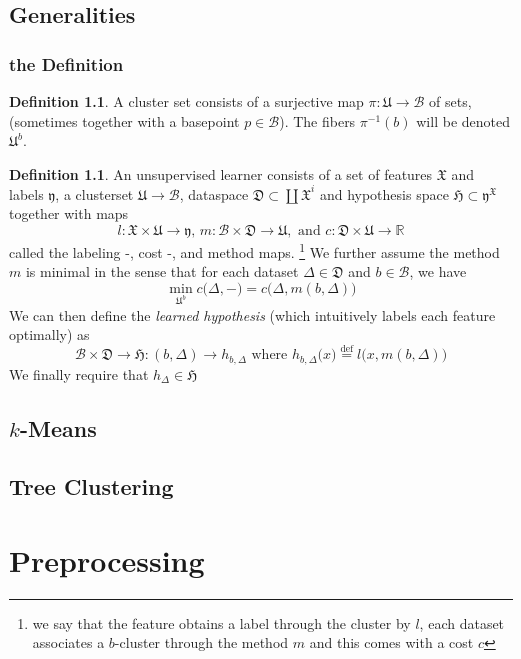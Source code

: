 \documentclass{book}
\theoremstyle{plain}
\theoremstyle{definition}
\newtheorem{definition}[corollary]{Definition}
\renewcommand{\d}[1]{\mathbb{#1}}
\newcommand{\define}{\stackrel{\operatorname{def}}{=}}
\newcommand{\f}[1]{\mathfrak{#1}}
\newcommand{\mor}{\longrightarrow}
\renewcommand{\r}[1]{\mathcal{#1}}
\renewcommand{\r}[1]{\mathcal{#1}}
\begin{document}
\chapter{Generalities}


\section{the Definition}

\begin{definition}
A cluster set consists of a surjective map $\pi:\f{U}\mor \r{B}$ of sets, (sometimes together with a basepoint $p\in \r{B}$). The fibers $\pi^{-1}(b)$ will be denoted $\f{U}^b$.
\end{definition}

\begin{definition}
An unsupervised learner consists of a set of features $\f{X}$ and labels $\f{y}$, a clusterset $\f{U}\mor \r{B}$, dataspace $\f{D}\subset \coprod \f{X}^i$ and hypothesis space $\f{H}\subset \f{y}^\f{X}$ together with maps
\[
l:\f{X}\times \f{U}\mor \f{y},\,  m:\r{B}\times \f{D}\mor \f{U}, \textrm{ and } c:\f{D}\times \f{U}\mor \d{R}
\] 
called the labeling -, cost -, and method maps. 
\footnote{\noindent we say that the feature obtains a label through the cluster by $l$, each dataset associates a $b$-cluster through the method $m$ and this comes with a cost $c$} 
We further assume the method $m$ is minimal in the sense that for each dataset $\Delta \in \f{D}$ and $b \in \r{B}$, we have
\[
\min_{\f{U}^b} c\big(\Delta, -\big)=c\big(\Delta,m(b, \Delta)\big)
\]
We can then define the \emph{learned hypothesis} (which intuitively labels each feature optimally) as
\[
\r{B}\times \f{D}\mor \f{H}: (b,\Delta)\mor h_{b,\Delta}
\textrm{ where } h_{b,\Delta}\big(x\big)\define l\big(x,m(b,\Delta)\big)
\]
We finally require that $h_\Delta \in \f{H}$
\end{definition}

\chapter{$k$-Means}

\chapter{Tree Clustering}

\part{Preprocessing}
\end{document}

